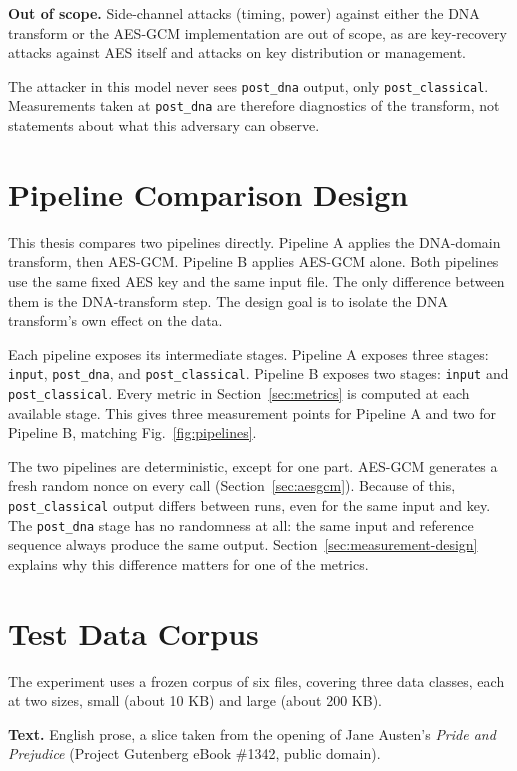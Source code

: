 \documentclass[12pt,a4paper,twoside]{report}
\numberwithin{equation}{chapter}
\begin{document}
\textbf{Out of scope.} Side-channel attacks (timing, power) against either the DNA
transform or the AES-GCM implementation are out of scope, as are
key-recovery attacks against AES itself and attacks on key
distribution or management.

The attacker in this model never sees \texttt{post\_dna} output, only
\texttt{post\_classical}. Measurements taken at \texttt{post\_dna} are
therefore diagnostics of the transform, not statements about what this
adversary can observe.

\section{Pipeline Comparison Design}
\label{sec:pipeline-design}
This thesis compares two pipelines directly. Pipeline A applies the DNA-domain transform,
then AES-GCM. Pipeline B applies AES-GCM alone. Both pipelines use the
same fixed AES key and the same input file. The only difference between
them is the DNA-transform step. The design goal is to isolate the DNA
transform's own effect on the data.

Each pipeline exposes its intermediate stages. Pipeline A exposes three stages:
\texttt{input}, \texttt{post\_dna}, and \texttt{post\_classical}.
Pipeline B exposes two stages: \texttt{input} and
\texttt{post\_classical}. Every metric in Section~\ref{sec:metrics} is
computed at each available stage. This gives three measurement points
for Pipeline A and two for Pipeline B, matching Fig.~\ref{fig:pipelines}.

The two pipelines are deterministic, except for one part. AES-GCM
generates a fresh random nonce on every call
(Section~\ref{sec:aesgcm}). Because of this, \texttt{post\_classical}
output differs between runs, even for the same input and key. The
\texttt{post\_dna} stage has no randomness at all: the same input and
reference sequence always produce the same output.
Section~\ref{sec:measurement-design} explains why this difference matters for one
of the metrics.

\section{Test Data Corpus}
\label{sec:corpus}
The experiment uses a frozen corpus of six files, covering three data classes, each at two sizes, small (about 10 KB)
and large (about 200 KB).

\textbf{Text.} English prose, a slice taken from the opening of Jane
Austen's \emph{Pride and Prejudice} (Project Gutenberg eBook \#1342,
public domain).
\end{document}
